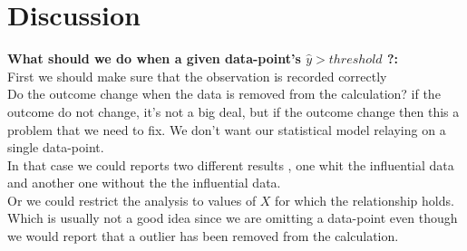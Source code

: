 \documentclass{article}[20pt]
\begin{document}
\newpage

\section{Discussion}
{ \bf What should we do when a given data-point's $ \hat{y} > threshold$ ?:}\\


First we should make sure that the observation is recorded correctly\\
Do the outcome change when the data is removed from the calculation? if the outcome do not change, it's not a big deal, but if the outcome change then this a problem that we need to fix. We don't want our statistical model relaying on a single data-point.\\

In that case we could reports two different results , one whit the influential data and another one without the the influential data.\\

Or we could restrict the analysis to values of $X$ for which the relationship holds. Which is usually not a good idea since we are omitting a data-point even though we would report that a outlier has been removed from the calculation. 



\bigskip




\end{document}
